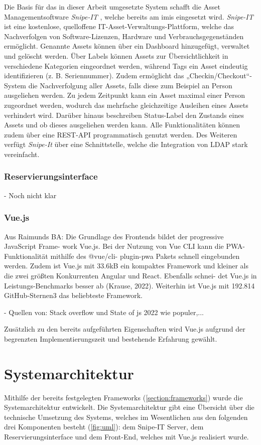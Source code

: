 Die Basis für das in dieser Arbeit umgesetzte System schafft die Asset Managementsoftware
\textit{Snipe-IT} \cite{noauthor_home_nodate}, welche bereits am \ac{imis} eingesetzt wird.
\textit{Snipe-IT} ist eine kostenlose, quelloffene IT-Asset-Verwaltungs-Plattform, welche das
Nachverfolgen von Software-Lizenzen, Hardware und Verbrauchsgegenständen ermöglicht. Genannte Assets
können über ein Dashboard hinzugefügt, verwaltet und gelöscht werden. Über Labels können Assets zur
Übersichtlichkeit in verschiedene Kategorien eingeordnet werden, während Tags ein Asset eindeutig
identifizieren (z. B. Seriennummer). Zudem ermöglicht das „Checkin/Checkout“-System die
Nachverfolgung aller Assets, falls diese zum Beispiel an Person ausgeliehen werden. Zu jedem
Zeitpunkt kann ein Asset maximal einer Person zugeordnet werden, wodurch das mehrfache gleichzeitige
Ausleihen eines Assets verhindert wird. Darüber hinaus beschreiben Status-Label den Zustands eines
Assets und ob dieses ausgeliehen werden kann. Alle Funktionalitäten können zudem über eine REST-API
programmatisch genutzt werden. Des Weiteren verfügt \textit{Snipe-It} über eine Schnittstelle,
welche die Integration von LDAP stark vereinfacht.

\subsubsection{Reservierungsinterface}
- Noch nicht klar

\subsubsection{Vue.js}
Aus Raimunds BA: Die Grundlage des Frontends bildet der progressive JavaScript Frame-
work Vue.js. Bei der Nutzung von Vue CLI kann die PWA-Funktionalität mithilfe des @vue/cli-
plugin-pwa Pakets schnell eingebunden werden. Zudem ist Vue.js mit 33.6kB ein kompaktes Framework
und kleiner als die zwei größten Konkurrenten Angular und React. Ebenfalls schnei- det Vue.js in
Leistungs-Benchmarks besser ab (Krause, 2022). Weiterhin ist Vue.js mit 192.814 GitHub-Sternen3 das
beliebteste Framework.

- Quellen von: Stack overflow und State of js 2022 wie populer,...

Zusätzlich zu den bereits aufgeführten Eigenschaften wird Vue.js aufgrund der begrenzten
Implementierungszeit und bestehende Erfahrung gewählt.

\section{Systemarchitektur}
Mithilfe der bereits festgelegten Frameworks (\ref{section:frameworks}) wurde die Systemarchitektur
entwickelt. Die Systemarchitektur gibt eine Übersicht über die technische Umsetzung des Systems,
welches im Wesentlichen aus den folgenden drei Komponenten besteht (\ref{fig:uml}): dem Snipe-IT
Server, dem Reservierungsinterface und dem Front-End, welches mit Vue.js realisiert wurde.

